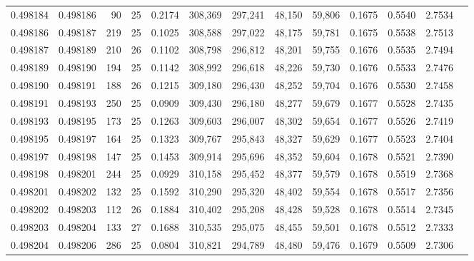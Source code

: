 \begin{tabular}{rrrrrrrrrrrrr}
0.498184 & 0.498186 &  90 &  25 &                                     0.2174 & 308,369 & 297,241 &  48,150 &  59,806 & 0.1675 & 0.5540 & 2.7534 \\
0.498186 & 0.498187 & 219 &  25 &                                     0.1025 & 308,588 & 297,022 &  48,175 &  59,781 & 0.1675 & 0.5538 & 2.7513 \\
0.498187 & 0.498189 & 210 &  26 &                                     0.1102 & 308,798 & 296,812 &  48,201 &  59,755 & 0.1676 & 0.5535 & 2.7494 \\
0.498189 & 0.498190 & 194 &  25 &                                     0.1142 & 308,992 & 296,618 &  48,226 &  59,730 & 0.1676 & 0.5533 & 2.7476 \\
0.498190 & 0.498191 & 188 &  26 &                                     0.1215 & 309,180 & 296,430 &  48,252 &  59,704 & 0.1676 & 0.5530 & 2.7458 \\
0.498191 & 0.498193 & 250 &  25 &                                     0.0909 & 309,430 & 296,180 &  48,277 &  59,679 & 0.1677 & 0.5528 & 2.7435 \\
0.498193 & 0.498195 & 173 &  25 &                                     0.1263 & 309,603 & 296,007 &  48,302 &  59,654 & 0.1677 & 0.5526 & 2.7419 \\
0.498195 & 0.498197 & 164 &  25 &                                     0.1323 & 309,767 & 295,843 &  48,327 &  59,629 & 0.1677 & 0.5523 & 2.7404 \\
0.498197 & 0.498198 & 147 &  25 &                                     0.1453 & 309,914 & 295,696 &  48,352 &  59,604 & 0.1678 & 0.5521 & 2.7390 \\
0.498198 & 0.498201 & 244 &  25 &                                     0.0929 & 310,158 & 295,452 &  48,377 &  59,579 & 0.1678 & 0.5519 & 2.7368 \\
0.498201 & 0.498202 & 132 &  25 &                                     0.1592 & 310,290 & 295,320 &  48,402 &  59,554 & 0.1678 & 0.5517 & 2.7356 \\
0.498202 & 0.498203 & 112 &  26 &                                     0.1884 & 310,402 & 295,208 &  48,428 &  59,528 & 0.1678 & 0.5514 & 2.7345 \\
0.498203 & 0.498204 & 133 &  27 &                                     0.1688 & 310,535 & 295,075 &  48,455 &  59,501 & 0.1678 & 0.5512 & 2.7333 \\
0.498204 & 0.498206 & 286 &  25 &                                     0.0804 & 310,821 & 294,789 &  48,480 &  59,476 & 0.1679 & 0.5509 & 2.7306 \\

\end{tabular}
